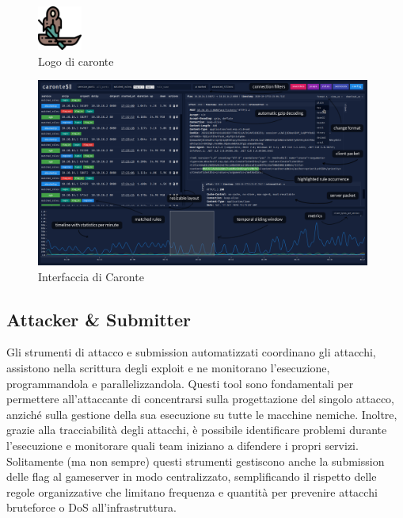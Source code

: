 \begin{figure}[H]
    \centering
    \includegraphics[width=0.13\textwidth]{images/chapter1/CaronteLogo.png}
    \caption{Logo di caronte}\label{fig:caronte_logo}
\end{figure}

\begin{figure}[H]
    \centering
    \includegraphics[width=0.98\textwidth]{images/chapter1/caronte_interface.png}
    \caption{Interfaccia di Caronte}\label{fig:caronte_interface}
\end{figure}

\subsection{Attacker \& Submitter}

Gli strumenti di attacco e submission automatizzati coordinano gli attacchi, assistono nella scrittura degli exploit e ne monitorano l'esecuzione, programmandola e parallelizzandola. Questi tool sono fondamentali per permettere all'attaccante di concentrarsi sulla progettazione del singolo attacco, anziché sulla gestione della sua esecuzione su tutte le macchine nemiche. Inoltre, grazie alla tracciabilità degli attacchi, è possibile identificare problemi durante l'esecuzione e monitorare quali team iniziano a difendere i propri servizi. Solitamente (ma non sempre) questi strumenti gestiscono anche la submission delle flag al gameserver in modo centralizzato, semplificando il rispetto delle regole organizzative che limitano frequenza e quantità per prevenire attacchi bruteforce o DoS all'infrastruttura.

